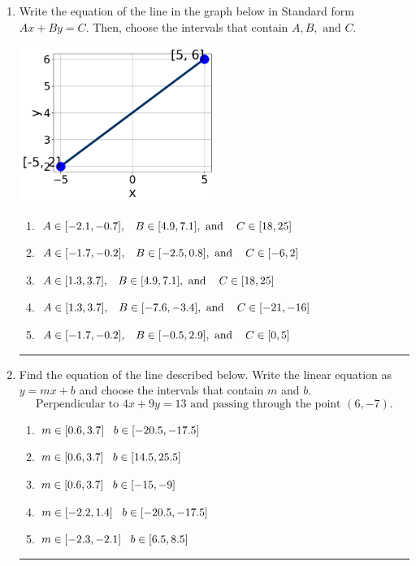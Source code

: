 \documentclass[14pt]{extbook}
\newcommand{\litem}[1]{\item#1\hspace*{-1cm}\rule{\textwidth}{0.4pt}}
\begin{document}
\begin{enumerate}
{\begin{enumerate}[label=\Alph*.]
\end{enumerate} }
\litem{
Write the equation of the line in the graph below in Standard form $Ax+By=C$. Then, choose the intervals that contain $A, B, \text{ and } C$.
\begin{center}
    \includegraphics[width=0.5\textwidth]{../Figures/linearGraphToStandardCopyB.png}
\end{center}
\begin{enumerate}[label=\Alph*.]
\item \( A \in [-2.1, -0.7], \hspace{3mm} B \in [4.9, 7.1], \text{ and } \hspace{3mm} C \in [18, 25] \)
\item \( A \in [-1.7, -0.2], \hspace{3mm} B \in [-2.5, 0.8], \text{ and } \hspace{3mm} C \in [-6, 2] \)
\item \( A \in [1.3, 3.7], \hspace{3mm} B \in [4.9, 7.1], \text{ and } \hspace{3mm} C \in [18, 25] \)
\item \( A \in [1.3, 3.7], \hspace{3mm} B \in [-7.6, -3.4], \text{ and } \hspace{3mm} C \in [-21, -16] \)
\item \( A \in [-1.7, -0.2], \hspace{3mm} B \in [-0.5, 2.9], \text{ and } \hspace{3mm} C \in [0, 5] \)

\end{enumerate} }
\litem{
Find the equation of the line described below. Write the linear equation as $ y=mx+b $ and choose the intervals that contain $m$ and $b$.\[ \text{Perpendicular to } 4 x + 9 y = 13 \text{ and passing through the point } (6, -7). \]\begin{enumerate}[label=\Alph*.]
\item \( m \in [0.6, 3.7] \hspace*{3mm} b \in [-20.5, -17.5] \)
\item \( m \in [0.6, 3.7] \hspace*{3mm} b \in [14.5, 25.5] \)
\item \( m \in [0.6, 3.7] \hspace*{3mm} b \in [-15, -9] \)
\item \( m \in [-2.2, 1.4] \hspace*{3mm} b \in [-20.5, -17.5] \)
\item \( m \in [-2.3, -2.1] \hspace*{3mm} b \in [6.5, 8.5] \)


\end{enumerate}}
\end{enumerate}
\end{document}
